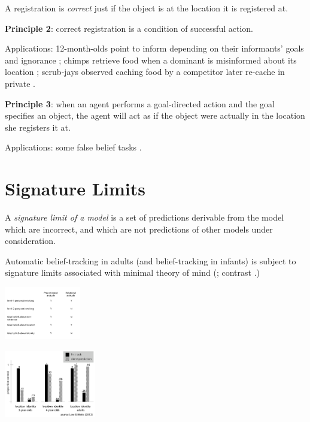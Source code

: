 \documentclass[12pt]{extarticle}
\begin{document}
\begin{multicols*}{3}
A registration is \emph{correct} just if the object is at the location it is registered at.

\textbf{Principle 2}: correct registration is a condition of successful action.

Applications: 12-month-olds point to inform depending on their informants’ goals and ignorance \citep{Liszkowski:2008al};
          chimps retrieve food when a dominant is misinformed about its location \citep{Hare:2001ph};
          scrub-jays observed caching food by a competitor later re-cache in private \citep{Clayton:2007fh,Emery:2007ze}.

\textbf{Principle 3}: when an agent performs a goal-directed action and the goal specifies an object, the agent will act as if the object were actually in the location she registers it at.

Applications: some false belief tasks \citep{Onishi:2005hm,Southgate:2007js,Buttelmann:2009gy}.




\section{Signature Limits}
A \emph{signature limit of a model} is a set of predictions derivable from the model which are
incorrect, and which are not predictions of other models under consideration.


Automatic belief-tracking in adults (and
belief-tracking in infants) is subject to signature limits
associated with minimal theory of mind
(\citealp{wang:2015_limits,low:2010_preschoolers,low:2014_quack,mozuraitis:2015_privileged,edwards:2017_reaction}; contrast \citealp{scott:2015_infants}.)

\begin{center}

\includegraphics[width=0.25\textwidth]{fig/signature_limits_table.png}

\end{center}

\begin{center}

\includegraphics[width=0.3\textwidth]{fig/low_2012_fig.png}


\end{center}
\end{multicols*}
\end{document}
